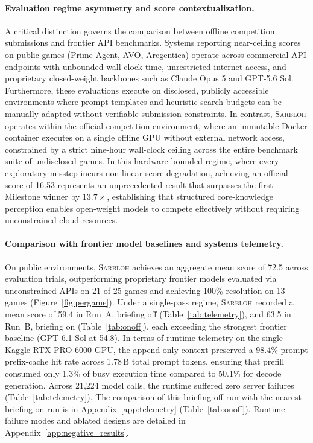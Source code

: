 \paragraph{Evaluation regime asymmetry and score contextualization.}
A critical distinction governs the comparison between offline competition submissions and frontier API benchmarks. Systems reporting near-ceiling scores on public games (Prime Agent, AVO, Arcgentica) operate across commercial API endpoints with unbounded wall-clock time, unrestricted internet access, and proprietary closed-weight backbones such as Claude Opus 5 and GPT-5.6 Sol. Furthermore, these evaluations execute on disclosed, publicly accessible environments where prompt templates and heuristic search budgets can be manually adapted without verifiable submission constraints. In contrast, \textsc{Sarbloh} operates within the official competition environment, where an immutable Docker container executes on a single offline GPU without external network access, constrained by a strict nine-hour wall-clock ceiling across the entire benchmark suite of undisclosed games. In this hardware-bounded regime, where every exploratory misstep incurs non-linear score degradation, achieving an official score of 16.53 represents an unprecedented result that surpasses the first Milestone winner by $13.7\times$, establishing that structured core-knowledge perception enables open-weight models to compete effectively without requiring unconstrained cloud resources.

\paragraph{Comparison with frontier model baselines and systems telemetry.}
On public environments, \textsc{Sarbloh} achieves an aggregate mean score of 72.5 across evaluation trials, outperforming proprietary frontier models evaluated via unconstrained APIs on 21 of 25 games and achieving 100\% resolution on 13 games (Figure~\ref{fig:pergame}). Under a single-pass regime, \textsc{Sarbloh} recorded a mean score of 59.4 in Run~A, briefing off (Table~\ref{tab:telemetry}), and 63.5 in Run~B, briefing on (Table~\ref{tab:onoff}), each exceeding the strongest frontier baseline (GPT-6.1 Sol at 54.8). 
In terms of runtime telemetry on the single Kaggle RTX PRO 6000 GPU, the append-only context preserved a 98.4\% prompt prefix-cache hit rate across 1.78\,B total prompt tokens, ensuring that prefill consumed only 1.3\% of busy execution time compared to 50.1\% for decode generation. Across 21,224 model calls, the runtime suffered zero server failures (Table~\ref{tab:telemetry}). The comparison of this briefing-off run with the nearest briefing-on run is in Appendix~\ref{app:telemetry} (Table~\ref{tab:onoff}). Runtime failure modes and ablated designs are detailed in Appendix~\ref{app:negative_results}.
